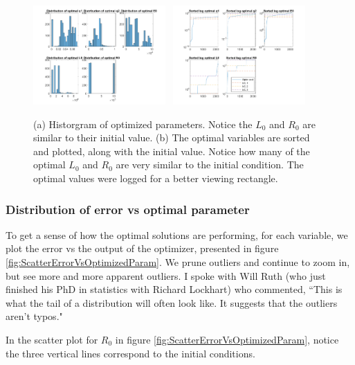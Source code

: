 \documentclass{article}
\begin{document}
\begin{figure}
	
	\centering
	\includegraphics[width=0.45\textwidth]{Optimized parameter distribution across sensitivity analysis Run 2.png}  ~\includegraphics[width=0.45\textwidth]{Optimized parameter log sorted with starting values Run 2.png}
	
	\caption{(a) Historgram of optimized parameters.  Notice the $L_0$ and $R_0$ are similar to their initial value. (b) The optimal variables are sorted and plotted, along with the initial value.  Notice how many of the optimal $L_0$ and $R_0$ are very similar to the initial condition.  The optimal values were logged for a better viewing rectangle.}
	
	\label{fig:est_dist}
\end{figure}

\subsubsection{Distribution of error vs optimal parameter}

To get a sense of how the optimal solutions are performing, for each variable, we plot the error vs the output of the optimizer, presented in figure \ref{fig:ScatterErrorVsOptimizedParam}.  We prune outliers and continue to zoom in, but see more and more apparent outliers.  I spoke with Will Ruth (who just finished his PhD in statistics with Richard Lockhart) who commented, ``This is what the tail of a distribution will often look like. It suggests that the outliers aren't typos."  

In the scatter plot for $R_0$ in figure \ref{fig:ScatterErrorVsOptimizedParam}, notice the three vertical lines correspond to the initial conditions.
\end{document}
